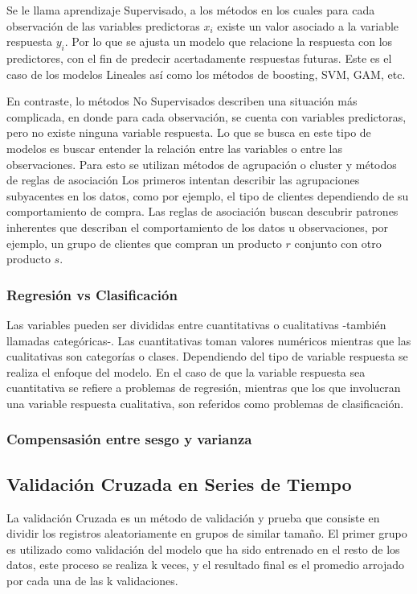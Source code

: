 \documentclass[a4paper,12pt]{Latex/Classes/PhDthesisPSnPDF}
\begin{document}
Se le llama aprendizaje Supervisado, a los métodos en los cuales para cada observación de las variables predictoras $x_{i}$ existe un valor asociado a la variable respuesta $y_{i}$. Por lo que se ajusta un modelo que relacione la respuesta con los predictores, con el fin de predecir acertadamente respuestas futuras. Este es el caso de los modelos Lineales así como los métodos de boosting, SVM, GAM, etc. 

En contraste, lo métodos No Supervisados describen una situación más complicada, en donde para cada observación, se cuenta con variables predictoras, pero no existe ninguna variable respuesta. Lo que se busca en este tipo de modelos es buscar entender la relación entre las variables o entre las observaciones. Para esto se utilizan métodos de agrupación o cluster y métodos de reglas de asociación Los primeros intentan describir las agrupaciones subyacentes en los datos, como por ejemplo, el tipo de clientes dependiendo de su comportamiento de compra. Las reglas de asociación buscan descubrir patrones inherentes que describan el comportamiento de los datos u observaciones, por ejemplo, un grupo de clientes que compran un producto $r$ conjunto con otro producto $s$.

\subsubsection{Regresión vs Clasificación}

Las variables pueden ser divididas entre cuantitativas o cualitativas -también llamadas categóricas-. Las cuantitativas toman valores numéricos mientras que las cualitativas son categorías o clases. Dependiendo del tipo de variable respuesta se realiza el enfoque del modelo. En el caso de que la variable respuesta sea cuantitativa se refiere a problemas de regresión, mientras que los que involucran una variable respuesta cualitativa, son referidos como problemas de clasificación.

\subsubsection{Compensasión entre sesgo y varianza}



\subsection{Validación Cruzada en Series de Tiempo}

La validación Cruzada es un método de validación y prueba que consiste en dividir los registros aleatoriamente en grupos de similar tamaño. El primer grupo es utilizado como validación del modelo que ha sido entrenado en el resto de los datos, este proceso se realiza k veces, y el resultado final es el promedio arrojado por cada una de las k validaciones.
\end{document}
